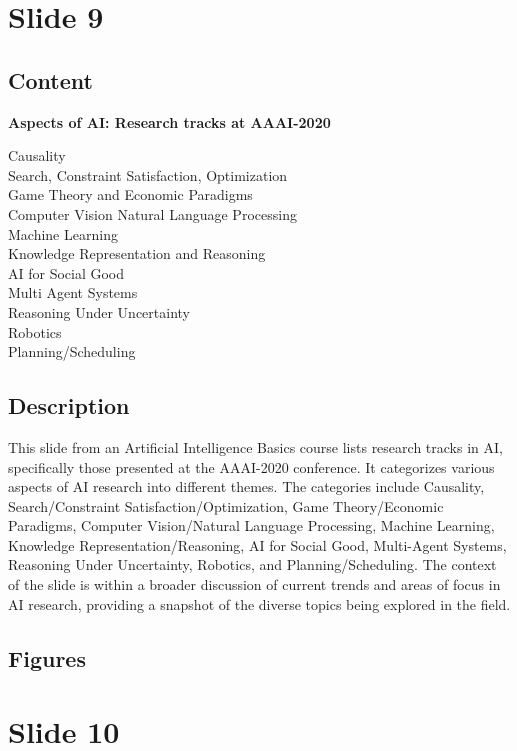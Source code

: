 \documentclass{article}%
\begin{document}
%
\newpage%
\section{Slide 9}%
\label{sec:Slide9}%
\subsection{Content}%

\textbf{Aspects of AI: Research tracks at AAAI-2020}

Causality \\
Search, Constraint Satisfaction, Optimization \\
Game Theory and Economic Paradigms \\
Computer Vision Natural Language Processing \\
Machine Learning \\
Knowledge Representation and Reasoning \\
AI for Social Good \\
Multi Agent Systems \\
Reasoning Under Uncertainty \\
Robotics \\
Planning/Scheduling
%
\subsection{Description}%
This slide from an Artificial Intelligence Basics course lists research tracks in AI, specifically those presented at the AAAI-2020 conference.  It categorizes various aspects of AI research into different themes.  The categories include Causality, Search/Constraint Satisfaction/Optimization, Game Theory/Economic Paradigms, Computer Vision/Natural Language Processing, Machine Learning, Knowledge Representation/Reasoning, AI for Social Good, Multi-Agent Systems, Reasoning Under Uncertainty, Robotics, and Planning/Scheduling.  The context of the slide is within a broader discussion of current trends and areas of focus in AI research, providing a snapshot of the diverse topics being explored in the field.%
\subsection{Figures}%
\begin{figure}[H]%
\centering%
\end{figure}

%
\newpage%
\section{Slide 10}%
\label{sec:Slide10}%
\end{document}
